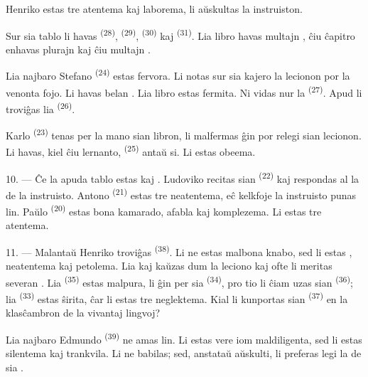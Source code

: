 Henriko estas tre atentema kaj laborema, li aŭskultas la instruiston.

Sur sia tablo li havas  \textsuperscript{(28)},
 \textsuperscript{(29)}, 
\textsuperscript{(30)} kaj  \textsuperscript{(31)}. Lia libro
havas multajn , ĉiu ĉapitro enhavas plurajn
 kaj ĉiu  multajn .

Lia najbaro Stefano \textsuperscript{(24)} estas fervora. Li notas sur sia
kajero la lecionon por la venonta fojo. Li havas belan .
Lia libro estas fermita. Ni vidas nur la 
\textsuperscript{(27)}. Apud li troviĝas lia 
\textsuperscript{(26)}.

Karlo \textsuperscript{(23)} tenas per la mano sian libron, li malfermas ĝin
por relegi sian lecionon. Li havas, kiel ĉiu lernanto, 
\textsuperscript{(25)} antaŭ si. Li estas obeema.

10. --- Ĉe la apuda tablo estas  kaj .
Ludoviko recitas sian  \textsuperscript{(22)} kaj respondas al
la  de la instruisto. Antono \textsuperscript{(21)} estas tre
neatentema, eĉ kelkfoje la instruisto punas lin. Paŭlo \textsuperscript{(20)}
estas bona kamarado, afabla kaj komplezema. Li estas tre atentema.

\VUsaut{4.2mm}
\VUsaut{3.2mm}

11. --- Malantaŭ Henriko troviĝas  \textsuperscript{(38)}. Li ne
estas malbona knabo, sed li estas , neatentema kaj petolema.
Lia  kaj  kaŭzas  dum la
leciono kaj ofte li meritas severan . Lia 
\textsuperscript{(35)} estas malpura, li  ĝin per sia
 \textsuperscript{(34)}, pro tio li ĉiam uzas sian
 \textsuperscript{(36)}; lia 
\textsuperscript{(33)} estas ŝirita, ĉar li estas tre neglektema. Kial li
kunportas sian  \textsuperscript{(37)} en la klasĉambron
de la vivantaj lingvoj?

Lia najbaro Edmundo \textsuperscript{(39)} ne amas lin. Li estas vere iom
maldiligenta, sed li estas silentema kaj trankvila. Li ne babilas; sed,
anstataŭ aŭskulti, li preferas legi la  de sia
.

